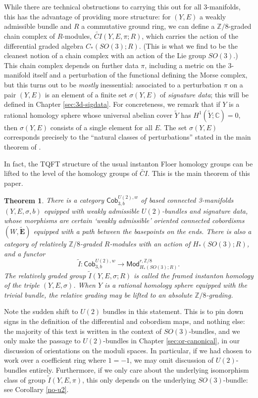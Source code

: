 \documentclass{memo-l}
\newtheorem{theorem}{Theorem}[chapter]
\theoremstyle{definition}
\theoremstyle{remark}
\numberwithin{section}{chapter}
\numberwithin{equation}{chapter}
\begin{document}
While there are technical obstructions to carrying this out for all 3-manifolds, this has the advantage of providing more structure: for $(Y,E)$ a weakly admissible bundle and $R$ a commutative ground ring, we can define a $\mathbb Z/8$-graded chain complex of $R$-modules, $\widetilde{CI}(Y,E,\pi;R)$, which carries the action of the differential graded algebra $C_*(SO(3);R)$. (This is what we find to be the cleanest notion of a chain complex with an action of the Lie group $SO(3)$.) This chain complex depends on further data $\pi$, including a metric on the 3-manifold itself and a perturbation of the functional defining the Morse complex, but this turns out to be \textit{mostly} inessential: associated to a perturbation $\pi$ on a pair $(Y, E)$ is an element of a finite set $\sigma(Y,E)$ of \textit{signature data}; this will be defined in Chapter \ref{sec:3d-sigdata}. For concreteness, we remark that if $Y$ is a rational homology sphere whose universal abelian cover $\tilde Y$ has $H^1(\tilde Y; \mathbb C) = 0$, then $\sigma(Y, E)$ consists of a single element for all $E$. The set $\sigma(Y,E)$ corresponds precisely to the ``natural classes of perturbations'' stated in the main theorem of \cite{AB}.

In fact, the TQFT structure of the usual instanton Floer homology groups can be lifted to the level of the homology groups of $\widetilde{CI}$. This is the main theorem of this paper.

\begin{theorem}\label{main}There is a category $\mathsf{Cob}_{3,b}^{U(2),w}$ of based connected 3-manifolds $(Y,E,\sigma,b)$ equipped with weakly admissible $U(2)$-bundles and signature data, whose morphisms are certain `weakly admissible' oriented connected cobordisms $(W,\widetilde{\mathbf{E}})$ equipped with a path between the basepoints on the ends. There is also a category of relatively $\mathbb Z/8$-graded $R$-modules with an action of $H_*(SO(3);R)$, and a functor $$\widetilde{I}: \mathsf{Cob}_{3,b}^{U(2),w} \to \mathsf{Mod}^{r,\mathbb Z/8}_{H_*(SO(3);R)}.$$ The relatively graded group $\widetilde I(Y,E,\sigma;R)$ is called the \textit{framed instanton homology} of the triple $(Y,E,\sigma)$. When $Y$ is a rational homology sphere equipped with the trivial bundle, the relative grading may be lifted to an absolute $\mathbb Z/8$-grading.
\end{theorem}

Note the sudden shift to $U(2)$ bundles in this statement. This is to pin down signs in the definition of the differential and cobordism maps, and nothing else: the majority of this text is written in the context of $SO(3)$-bundles, and we only make the passage to $U(2)$-bundles in Chapter \ref{sec:or-canonical}, in our discussion of orientations on the moduli spaces. In particular, if we had chosen to work over a coefficient ring where $1 = -1$, we may omit discussion of $U(2)$-bundles entirely. Furthermore, if we only care about the underlying isomorphism class of group $\tilde I(Y, E, \pi)$, this only depends on the underlying $SO(3)$-bundle: see Corollary \ref{no-u2}.
\end{document}
